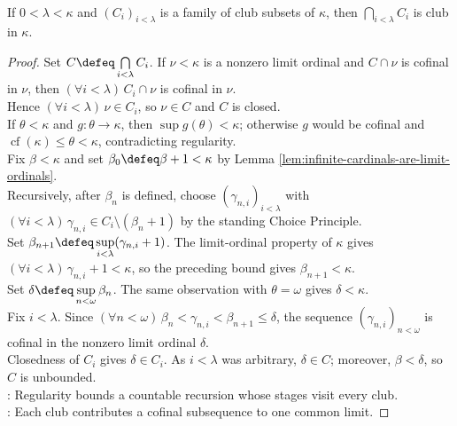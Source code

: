 \begin{theorem} \label{thm:intersection-of-fewer-than-kappa-clubs} \\
If $0<\lambda<\kappa$ and $(C_i)_{i<\lambda}$ is a family of club subsets of $\kappa$, then $\bigcap\limits_{i<\lambda}C_i$ is club in $\kappa$.
\begin{proof}
Set $C\defeq\bigcap\limits_{i<\lambda}C_i$. If $\nu<\kappa$ is a nonzero limit ordinal and $C\cap\nu$ is cofinal in $\nu$, then $(\forall i<\lambda)\,C_i\cap\nu$ is cofinal in $\nu$.\\
Hence $(\forall i<\lambda)\,\nu\in C_i$, so $\nu\in C$ and $C$ is closed.\\
If $\theta<\kappa$ and $g:\theta\to\kappa$, then $\sup g(\theta)<\kappa$; otherwise $g$ would be cofinal and $\operatorname{cf}(\kappa)\leq\theta<\kappa$, contradicting regularity.\\
Fix $\beta<\kappa$ and set $\beta_0\defeq\beta+1<\kappa$ by Lemma \ref{lem:infinite-cardinals-are-limit-ordinals}.\\
Recursively, after $\beta_n$ is defined, choose $(\gamma_{n,i})_{i<\lambda}$ with $(\forall i<\lambda)\,\gamma_{n,i}\in C_i\setminus(\beta_n+1)$ by the standing Choice Principle.\\
Set $\beta_{n+1}\defeq\sup\limits_{i<\lambda}(\gamma_{n,i}+1)$. The limit-ordinal property of $\kappa$ gives $(\forall i<\lambda)\,\gamma_{n,i}+1<\kappa$, so the preceding bound gives $\beta_{n+1}<\kappa$.\\
Set $\delta\defeq\sup\limits_{n<\omega}\beta_n$. The same observation with $\theta=\omega$ gives $\delta<\kappa$.\\
Fix $i<\lambda$. Since $(\forall n<\omega)\,\beta_n<\gamma_{n,i}<\beta_{n+1}\leq\delta$, the sequence $(\gamma_{n,i})_{n<\omega}$ is cofinal in the nonzero limit ordinal $\delta$.\\
Closedness of $C_i$ gives $\delta\in C_i$. As $i<\lambda$ was arbitrary, $\delta\in C$; moreover, $\beta<\delta$, so $C$ is unbounded.\\
: Regularity bounds a countable recursion whose stages visit every club.\\
: Each club contributes a cofinal subsequence to one common limit.
\end{proof}
\end{theorem}

